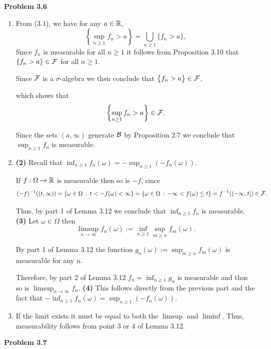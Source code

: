 \bigskip

\textbf{Problem 3.6} 

\begin{enumerate}[label=(\alph*)]
\item From (3.1), we have for any $a\in\mathbb R$,
\[
	\left\{ \sup_{n\ge 1} f_n>a\right\} = \bigcup_{n\ge 1} \bigl\{ f_n>a\bigr\},
\]
Since $f_n$ is measurable for all $n\ge 1$ it follows from Proposition 3.10 that $\{f_n>a\}\in\mathcal F$ for all $n\ge 1$. 

Since $\mathcal F$ is a $\sigma$-algebra we then conclude that $\bigl\{ f_n>a\bigr\}\in\mathcal F$, 

which shows that 
\[
	\left\{ \sup_{n\ge 1} f_n>a\right\} \in \mathcal F.
\]

Since the sets $(a,\infty)$ generate $\mathcal B$ by Proposition 2.7 we conclude that $\sup_{n\ge 1} f_n$ is measurable.
\item 

\textbf{(2)} Recall that $\inf_{n \ge 1} f_n(\omega) = - \sup_{n \ge 1} (-f_n(\omega))$. 

If $f : \Omega \to \mathbb R$ is measurable then so is $-f$, since 
\[
	(-f)^{-1}((t,\infty)) = \{\omega \in \Omega \, : \, t < -f(\omega) < \infty \}
	= \{\omega \in \Omega \, : \, -\infty < f(\omega) \le t\}
	= f^{-1}((-\infty,t]) \in \mathcal F.
\]

Thus, by part 1 of Lemma 3.12 we conclude that $\inf_{n \ge 1} f_n$ is measurable.
\textbf{(3)} Let $\omega \in \Omega$ then 
\[
	\limsup_{n \to \infty} f_n(\omega) := \inf_{n \ge 1} \sup_{m\ge n} f_m(\omega).
\]

By part 1 of Lemma 3.12 the function $g_n(\omega) := \sup_{m\ge n} f_m(\omega)$ is measurable for any $n$.

Therefore, by part 2 of Lemma 3.12 $f_n = \inf_{n \ge 1} g_n$ is measurable and thus so is $\limsup_{n \to \infty} f_n$.
\textbf{(4)} This follows directly from the previous part and the fact that $-\inf_{n \ge 1} f_n(\omega) = \sup_{n \ge 1} (-f_n(\omega))$.
\item If the limit exists it must be equal to both the $\limsup$ and $\liminf$. Thus, measurability follows from point 3 or 4 of Lemma 3.12.
\end{enumerate}



\bigskip

\textbf{Problem 3.7} 

